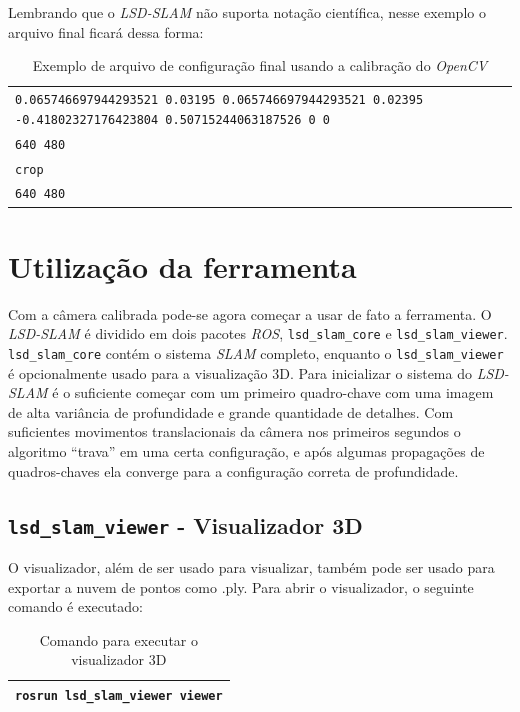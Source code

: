 Lembrando que o \textit{LSD-SLAM} não suporta notação científica, nesse exemplo o arquivo final ficará dessa forma:

\begin{table}[H]\label{tb:11}
\begin{tabular}{| p{\textwidth}|}
\hline
\texttt{0.065746697944293521 0.03195 0.065746697944293521 0.02395 -0.41802327176423804 0.50715244063187526 0 0}\\
\texttt{640 480}\\
\texttt{crop}\\
\texttt{640 480}\\
 \hline
\end{tabular}
\caption{Exemplo de arquivo de configuração final usando a calibração do \textit{OpenCV}}
\end{table}

\section{Utilização da ferramenta}

Com a câmera calibrada pode-se agora começar a usar de fato a ferramenta. O \textit{LSD-SLAM} é dividido em dois pacotes \textit{ROS}, \texttt{lsd\_slam\_core} e \texttt{lsd\_slam\_viewer}. \texttt{lsd\_slam\_core} contém o sistema \textit{SLAM} completo, enquanto o \texttt{lsd\_slam\_viewer} é opcionalmente usado para a visualização 3D.
Para inicializar o sistema do \textit{LSD-SLAM} é o suficiente começar com um primeiro quadro-chave com uma imagem de alta variância de profundidade e grande quantidade de detalhes. Com suficientes movimentos translacionais da câmera nos primeiros segundos o algoritmo “trava” em uma certa configuração, e após algumas propagações de quadros-chaves ela converge para a configuração correta de profundidade.

\subsection{\texttt{lsd\_slam\_viewer} - Visualizador 3D}

O visualizador, além de ser usado para visualizar, também pode ser usado para exportar a nuvem de pontos como .ply. Para abrir o visualizador, o seguinte comando é executado:

\begin{table}[H]\label{tb:12}
\begin{tabular}{| p{\textwidth}|}
\hline
\texttt{rosrun lsd\_slam\_viewer viewer}\\
\hline
\end{tabular}
\caption{Comando para executar o visualizador 3D}
\end{table}


